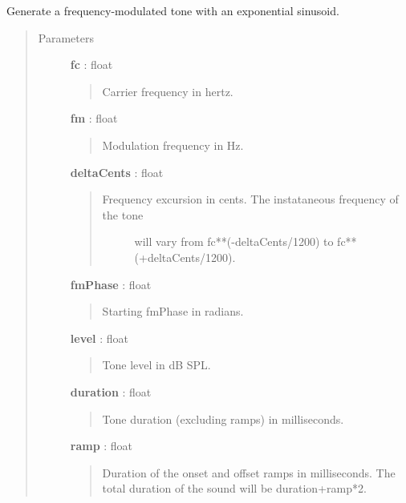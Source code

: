 \documentclass[a4paper,12pt,english]{sphinxmanual}
\begin{document}
\begin{fulllineitems}
\label{sndlib:sndlib.expSinFMTone}
Generate a frequency-modulated tone with an exponential sinusoid.
\begin{quote}\begin{description}
\item[{Parameters }] \leavevmode
\textbf{fc} : float
\begin{quote}

Carrier frequency in hertz.
\end{quote}

\textbf{fm} : float
\begin{quote}

Modulation frequency in Hz.
\end{quote}

\textbf{deltaCents} : float
\begin{quote}
\begin{description}
\item[{Frequency excursion in cents. The instataneous frequency of the tone}] \leavevmode
will vary from fc**(-deltaCents/1200) to fc**(+deltaCents/1200).

\end{description}
\end{quote}

\textbf{fmPhase} : float
\begin{quote}

Starting fmPhase in radians.
\end{quote}

\textbf{level} : float
\begin{quote}

Tone level in dB SPL.
\end{quote}

\textbf{duration} : float
\begin{quote}

Tone duration (excluding ramps) in milliseconds.
\end{quote}

\textbf{ramp} : float
\begin{quote}

Duration of the onset and offset ramps in milliseconds.
The total duration of the sound will be duration+ramp*2.
\end{quote}


\end{description}
\end{quote}
\end{fulllineitems}
\end{document}
